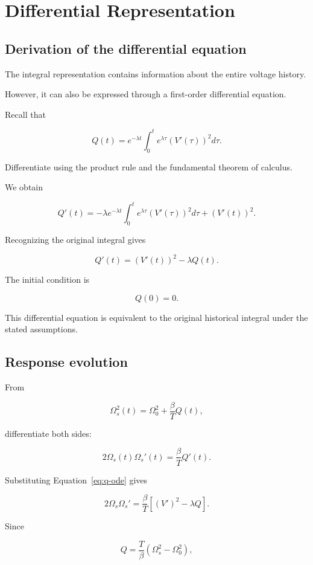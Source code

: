 \documentclass[12pt]{article}
\theoremstyle{definition}
\theoremstyle{remark}
\begin{document}
\section{Differential Representation}

\subsection{Derivation of the differential equation}

The integral representation contains
information about the entire voltage history.

However, it can also be expressed through
a first-order differential equation.

Recall that

\[
Q(t)=
e^{-\lambda t}
\int_0^t e^{\lambda\tau}
\left(V'(\tau)\right)^2d\tau.
\]

Differentiate using the product rule
and the fundamental theorem of calculus.

We obtain

\[
Q'(t)=
-\lambda e^{-\lambda t}
\int_0^t e^{\lambda\tau}
\left(V'(\tau)\right)^2d\tau
+
\left(V'(t)\right)^2.
\]

Recognizing the original integral gives

\begin{equation}
Q'(t)=
\left(V'(t)\right)^2-\lambda Q(t).
\label{eq:q-ode}
\end{equation}

The initial condition is

\[
Q(0)=0.
\]

This differential equation is equivalent
to the original historical integral under
the stated assumptions.

\subsection{Response evolution}

From

\[
\Omega_s^2(t)=
\Omega_0^2+\frac{\beta}{T}Q(t),
\]

differentiate both sides:

\[
2\Omega_s(t)\Omega_s'(t)
=
\frac{\beta}{T}Q'(t).
\]

Substituting Equation~\eqref{eq:q-ode} gives

\[
2\Omega_s\Omega_s'
=
\frac{\beta}{T}
\left[
(V')^2-\lambda Q
\right].
\]

Since

\[
Q=
\frac{T}{\beta}
\left(\Omega_s^2-\Omega_0^2\right),
\]
\end{document}
